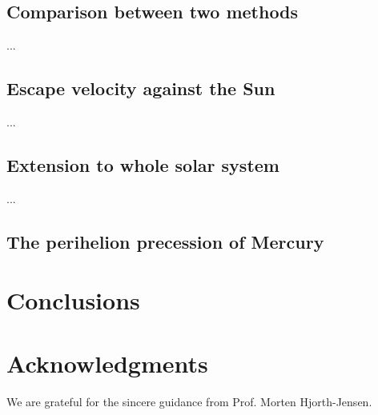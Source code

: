 \documentclass{article}
\begin{document}
	\subsection{Comparison between two methods}
	...

	\subsection{Escape velocity against the Sun}
	...
	
	\subsection{Extension to whole solar system}
	...
	
	\subsection{The perihelion precession of Mercury}
	
	\section{Conclusions}\label{conclude}
 
	
	\section*{Acknowledgments}
	We are grateful for the sincere guidance from Prof. Morten Hjorth-Jensen. 
	
	\nocite{*} 
	
	
\end{document}
